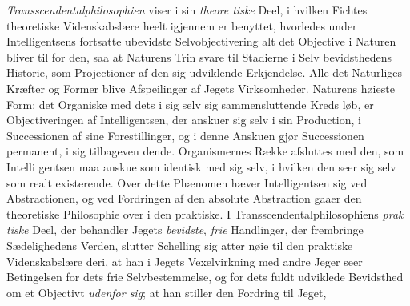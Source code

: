 \documentclass[12pt,a4paper]{book}
\begin{document}
\emph{Transscendentalphilosophien} viser i sin \emph{theore\-%
tiske} Deel, i hvilken Fichtes theoretiske Videnskabslære heelt
igjennem er benyttet, hvorledes under Intelligentsens fortsatte
ubevidste Selvobjectivering alt det Objective i Naturen bliver
til for den, saa at Naturens Trin svare til Stadierne i Selv\-%
bevidsthedens Historie, som Projectioner af den sig udviklende
Erkjendelse. Alle det Naturliges Kræfter og Former blive
Afspeilinger af Jegets Virksomheder. Naturens høieste Form:
det Organiske med dets i sig selv sig sammensluttende Kreds\-%
løb, er Objectiveringen af Intelligentsen, der anskuer sig selv
i sin Production, i Successionen af sine Forestillinger, og i
denne Anskuen gjør Successionen permanent, i sig tilbageven\-%
dende. Organismernes Række afsluttes med den, som Intelli\-%
gentsen maa anskue som identisk med sig selv, i hvilken den
seer sig selv som realt existerende. Over dette Phænomen hæver
Intelligentsen sig ved Abstractionen, og ved Fordringen af
den absolute Abstraction gaaer den theoretiske Philosophie
over i den praktiske. I Transscendentalphilosophiens \emph{prak\-%
tiske} Deel, der behandler Jegets \emph{bevidste}, \emph{frie} Handlinger,
der frembringe Sædelighedens Verden, slutter Schelling sig atter
nøie til den praktiske Videnskabslære deri, at han i Jegets
Vexelvirkning med andre Jeger seer Betingelsen for dets frie
Selvbestemmelse, og for dets fuldt udviklede Bevidsthed om et
Objectivt \emph{udenfor sig}; at han stiller den Fordring til Jeget,
\end{document}
